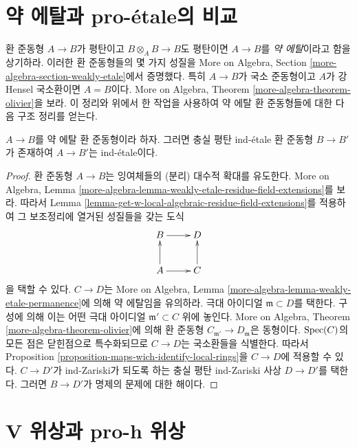 \section{약 에탈과 pro-\'etale의 비교}
\label{section-weakly-etale}

\noindent
환 준동형 $A \to B$가 평탄이고 $B \otimes_A B \to B$도 평탄이면
$A \to B$를 {\it 약 에탈}이라고 함을 상기하라. 이러한 환 준동형들의
몇 가지 성질을 More on Algebra, Section
\ref{more-algebra-section-weakly-etale}에서 증명했다.
특히 $A \to B$가 국소 준동형이고 $A$가 강 Hensel 국소환이면
$A = B$이다. More on Algebra, Theorem
\ref{more-algebra-theorem-olivier}을 보라.
이 정리와 위에서 한 작업을 사용하여 약 에탈 환 준동형들에 대한
다음 구조 정리를 얻는다.

\begin{proposition}
\label{proposition-weakly-etale}
$A \to B$를 약 에탈 환 준동형이라 하자.
그러면 충실 평탄 ind-\'etale 환 준동형 $B \to B'$가 존재하여
$A \to B'$는 ind-\'etale이다.
\end{proposition}

\begin{proof}
환 준동형 $A \to B$는 잉여체들의 (분리) 대수적 확대를 유도한다.
More on Algebra, Lemma
\ref{more-algebra-lemma-weakly-etale-residue-field-extensions}를 보라.
따라서 Lemma
\ref{lemma-get-w-local-algebraic-residue-field-extensions}를 적용하여
그 보조정리에 열거된 성질들을 갖는 도식
$$
\xymatrix{
B \ar[r] & D \\
A \ar[r] \ar[u] & C \ar[u]
}
$$
을 택할 수 있다. $C \to D$는 More on Algebra, Lemma
\ref{more-algebra-lemma-weakly-etale-permanence}에 의해 약 에탈임을
유의하라. 극대 아이디얼 $\mathfrak m \subset D$를 택한다.
구성에 의해 이는 어떤 극대 아이디얼 $\mathfrak m' \subset C$ 위에 놓인다.
More on Algebra, Theorem \ref{more-algebra-theorem-olivier}에 의해
환 준동형 $C_{\mathfrak m'} \to D_\mathfrak m$은 동형이다.
$\mathop{\mathrm{Spec}}(C)$의 모든 점은 닫힌점으로 특수화되므로
$C \to D$는 국소환들을 식별한다. 따라서 Proposition
\ref{proposition-maps-wich-identify-local-rings}을 $C \to D$에 적용할 수 있다.
$C \to D'$가 ind-Zariski가 되도록 하는 충실 평탄 ind-Zariski 사상
$D \to D'$를 택한다. 그러면 $B \to D'$가 명제의 문제에 대한 해이다.
\end{proof}





\section{V 위상과 pro-h 위상}
\label{section-V-versus-pro-h}


